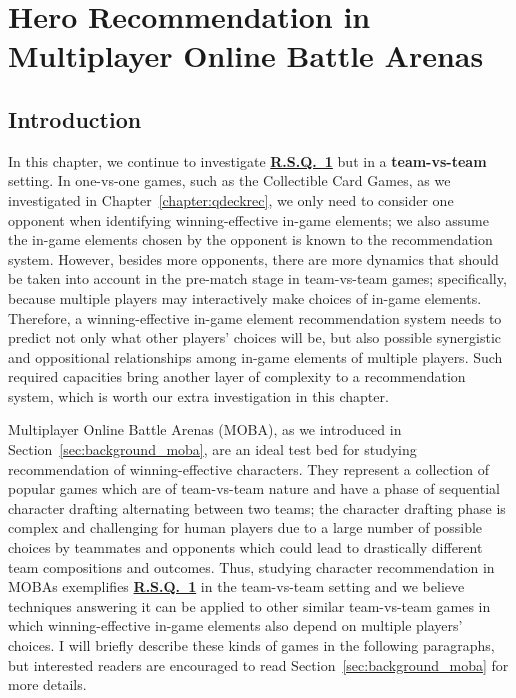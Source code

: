 \chapter{Hero Recommendation in Multiplayer Online Battle Arenas} 

\label{chapter:draftart} 

\section{Introduction}

In this chapter, we continue to investigate \hyperref[rq1]{\textbf{R.S.Q.~1}} but in a \textbf{team-vs-team} setting. In one-vs-one games, such as the Collectible Card Games, as we investigated in Chapter~\ref{chapter:qdeckrec}, we only need to consider one opponent when identifying winning-effective in-game elements; we also assume the in-game elements chosen by the opponent is known to the recommendation system. However, besides more opponents, there are more dynamics that should be taken into account in the pre-match stage in team-vs-team games; specifically, because multiple players may interactively make choices of in-game elements. Therefore, a winning-effective in-game element recommendation system needs to predict not only what other players' choices will be, but also possible synergistic and oppositional relationships among in-game elements of multiple players. Such required capacities bring another layer of complexity to a recommendation system, which is worth our extra investigation in this chapter.

Multiplayer Online Battle Arenas (MOBA), as we introduced in Section~\ref{sec:background_moba}, are an ideal test bed for studying recommendation of winning-effective characters. They represent a collection of popular games which are of team-vs-team nature and have a phase of sequential  character drafting alternating between two teams; the character drafting phase is complex and challenging for human players due to a large number of possible choices by teammates and opponents which could lead to drastically different team compositions and outcomes. Thus, studying character recommendation in MOBAs exemplifies \hyperref[rq1]{\textbf{R.S.Q.~1}} in the team-vs-team setting and we believe techniques answering it can be applied to other similar team-vs-team games in which winning-effective in-game elements also depend on multiple players' choices. I will briefly describe these kinds of games in the following paragraphs, but interested readers are encouraged to read Section~\ref{sec:background_moba} for more details. 

